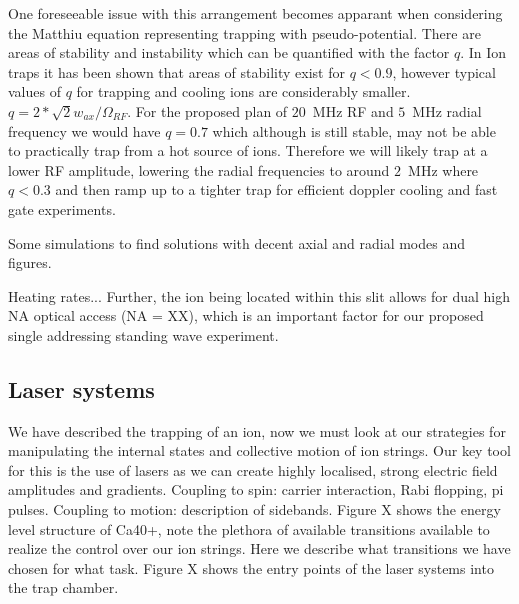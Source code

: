 \documentclass[12pt]{iopart}
\begin{document}
One foreseeable issue with this arrangement becomes apparant when
considering the Matthiu equation representing trapping with
pseudo-potential. There are areas of stability and instability which
can be quantified with the factor $q$. In Ion traps it has been shown
that areas of stability exist for $q<0.9$, however typical values of
$q$ for trapping and cooling ions are considerably smaller.
$q = 2*\sqrt{2}w_{ax}/\Omega_{RF}$.
For the proposed plan of $20$~MHz RF and $5$~MHz radial frequency we
would have $q = 0.7$ which although is still stable, may not be able
to practically trap from a hot source of ions. Therefore we will
likely trap at a lower RF amplitude, lowering the radial frequencies
to around $2$~MHz where $q<0.3$ and then ramp up to a tighter trap for
efficient doppler cooling and fast gate experiments.

Some simulations to find solutions with decent axial and radial modes and figures.

Heating rates... Further, the ion being located within this
slit allows for dual high NA optical access (NA = XX), which is an
important factor for our proposed single addressing standing wave
experiment.

\subsection{Laser systems}

We have described the trapping of an ion, now we must look at our
strategies for manipulating the internal states and collective motion
of ion strings. Our key tool for this is the use of lasers as we can
create highly localised, strong electric field amplitudes and
gradients. Coupling to spin: carrier interaction, Rabi flopping, pi
pulses. Coupling to motion: description of sidebands.
Figure X shows the energy level structure of Ca40+, note the plethora
of available transitions available to realize the control over our ion
strings. Here we describe what transitions we have chosen for what
task.
Figure X shows the entry points of the laser systems into the trap
chamber.
\end{document}
